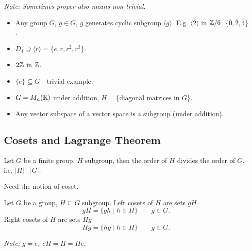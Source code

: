 \documentclass[10pt, a4paper]{article}
\begin{document}
\textit{Note:
Sometimes proper also means non-trivial.}

\begin{example}
    \begin{itemize}
        \item Any group $G$,
        $g \in G$,
        $g$ generates cyclic subgroup $\langle g \rangle$.
        E.g. $\langle \bar{2}\rangle$ in $\mathbb{Z} / 6$,
        $\{\bar{0}, \bar{2}, \bar{4}\}$.

        \item $D_4 \supseteq \langle r\rangle = \{e, r, r ^ 2, r ^ 3\}$.

        \item $2\mathbb{Z}$ in $\mathbb{Z}$.

        \item $\{e\} \subseteq G$ -
        trivial example.

        \item $G = M_n(\mathbb{R})$ under addition,
        $H = \{\text{diagonal matrices in $G$}\}$.

        \item Any vector subspace of a vector space is a subgroup
        (under addition).
    \end{itemize}
\end{example}

\subsection{Cosets and Lagrange Theorem}

\begin{theorem}[Lagrange]
    Let $G$ be a finite group,
    $H$ subgroup,
    then the order of $H$ divides the order of $G$,
    i.e. $|H| \mid |G|$.
\end{theorem}

Need the notion of coset.
\begin{definition}
    Let $G$ be a group,
    $H \subseteq G$ subgroup.
    Left cosets of $H$ are sets $gH$
    \[
    gH = \{gh \mid h \in H\}\qquad g \in G.
    \]
    Right cosets of $H$ are sets $Hg$
    \[
    Hg = \{hg \mid h \in H\}\qquad g \in G.
    \]
\end{definition}
\textit{Note:
$g = e$,
$eH = H = He$.}
\end{document}
